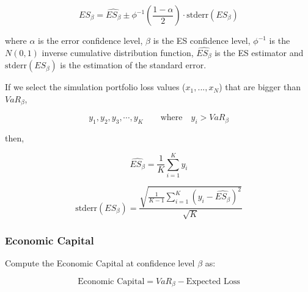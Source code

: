 \documentclass[a4paper,12pt,final]{article}
\begin{document}
\begin{displaymath}
ES_{\beta} = \widehat{ES_{\beta}} \pm \phi^{-1}\left(\frac{1-\alpha}{2}\right) \cdot \textrm{stderr}(ES_{\beta})
\end{displaymath}

where $\alpha$ is the error confidence level, $\beta$ is the ES confidence 
level, $\phi^{-1}$ is the $N(0,1)$ inverse cumulative distribution function, 
$\widehat{ES_{\beta}}$ is the ES estimator and $\textrm{stderr}(ES_{\beta})$
is the estimation of the standard error.
\newline

If we select the simulation portfolio loss values ($x_1, ..., x_N$) that are bigger 
than $VaR_{\beta}$,

\begin{displaymath}
y_1, y_2, y_3, \cdots, y_K \qquad \textrm{where} \quad y_i > VaR_{\beta}
\end{displaymath}

then,

\begin{displaymath}
\widehat{ES_{\beta}} = \frac{1}{K} \sum_{i=1}^{K} y_i
\end{displaymath}

\begin{displaymath}
\textrm{stderr}(ES_{\beta}) =
\frac{\sqrt{\frac{1}{K-1} \sum_{i=1}^{K} \left( y_i - \widehat{ES_{\beta}} \right)^2}}{\sqrt{K}}
\end{displaymath}

\subsubsection{Economic Capital}
Compute the Economic Capital at confidence level $\beta$ as:

\begin{displaymath}
\textrm{Economic Capital} = VaR_{\beta} - \textrm{Expected Loss}
\end{displaymath}

\end{document}
